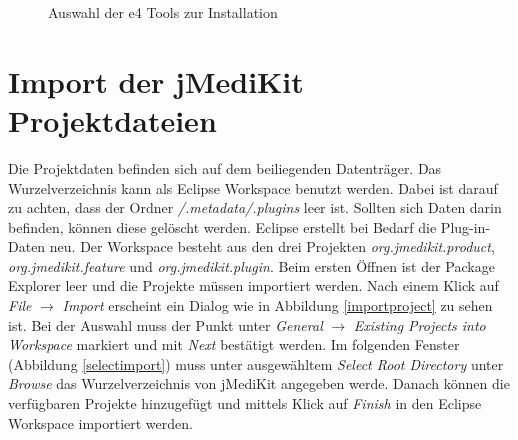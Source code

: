 \begin{figure}[H]
  \vspace{0.5cm}
  \centering
  \caption{Auswahl der e4 Tools zur Installation}
  \label{e4install}
  \vspace{0.5cm}
\end{figure}

\section{Import der jMediKit Projektdateien}

Die Projektdaten befinden sich auf dem beiliegenden Datenträger. Das Wurzelverzeichnis kann als Eclipse Workspace benutzt werden. Dabei ist darauf zu achten, dass der Ordner \textit{/.metadata/.plugins} leer ist. Sollten sich Daten darin befinden, können diese gelöscht werden. Eclipse erstellt bei Bedarf die Plug-in-Daten neu. Der Workspace besteht aus den drei Projekten \textit{org.jmedikit.product}, \textit{org.jmedikit.feature} und \textit{org.jmedikit.plugin}. Beim ersten Öffnen ist der Package Explorer leer und die Projekte müssen importiert werden. Nach einem Klick auf \textit{File} $\rightarrow$ \textit{Import} erscheint ein Dialog wie in Abbildung \ref{importproject} zu sehen ist. Bei der Auswahl muss der Punkt unter \textit{General} $\rightarrow$ \textit{Existing Projects into Workspace} markiert und mit \textit{Next} bestätigt werden. Im folgenden Fenster (Abbildung \ref{selectimport}) muss unter ausgewähltem \textit{Select Root Directory} unter \textit{Browse} das Wurzelverzeichnis von jMediKit angegeben werde. Danach können die verfügbaren Projekte hinzugefügt und mittels Klick auf \textit{Finish} in den Eclipse Workspace importiert werden.

